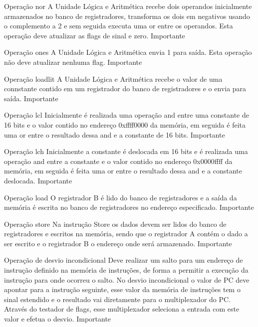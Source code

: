 \documentclass{report}
\begin{document}
\begin{functional}
      \requirement
      {Operação nor}
      {A Unidade Lógica e Aritmética recebe dois operandos inicialmente armazenados no banco de registradores, transforma os dois em negativos usando o complemento a 2 e sem seguida executa uma or entre os  operandos. Esta operação deve atualizar as flags de sinal e zero.}
      {Importante}
      
      \requirement
      {Operação ones}
      {A Unidade Lógica e Aritmética envia 1 para saída. Esta operação não deve atualizar nenhuma flag.}
      {Importante}
      
      \requirement
      {Operação loadlit}
      {A Unidade Lógica e Aritmética recebe o valor de uma connstante contido em um registrador do banco de registradores e o envia para saída.}
      {Importante}
      
       \requirement
      {Operação lcl}
      {Inicialmente é realizada uma operação and entre uma constante de 16 bits e o valor contido no endereço 0xffff0000 da memória, em seguida é feita uma or entre o resultado dessa and e a constante de 16 bits.}
      {Importante}
      
       \requirement
      {Operação lch}
      {Inicialmente a constante é deslocada em 16 bits e é realizada uma operação and entre a constante e o valor contido no endereço 0x0000ffff da memória, em seguida é feita uma or entre o resultado dessa and e a constante deslocada.}
      {Importante}
      
       \requirement
      {Operação load}
      {O registrador B é lido do banco de registradores e a saída da memória é escrita no banco de registradores no endereço especificado.}
      {Importante}
      
      \requirement
      {Operação store}
      {Na instrução Store os dados devem ser lidos do banco de registradores e escritos na memória, sendo que o registrador A contém o dado a ser escrito e o registrador B o endereço onde será armazenado.}
      {Importante}
      
       \requirement
      {Operação de desvio incondicional}
      {Deve realizar um salto para um endereço de instrução definido na memória de instruções, de forma a permitir a execução da instrução para onde ocorreu o salto. No desvio incondicional o valor de PC deve apontar para a instrução seguinte, esse valor da memória de instruções tem o sinal estendido e o resultado vai diretamente para o multiplexador do PC. Através do testador de flags, esse multiplexador seleciona a entrada com este valor e efetua o desvio.}
      {Importante}
      

\end{functional}
\end{document}
